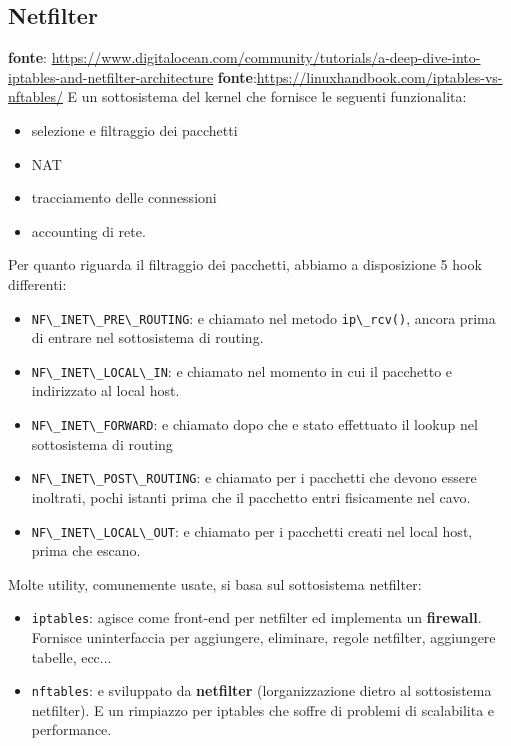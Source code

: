\subsection{Netfilter}\label{netfilter}

\textbf{fonte}:
\url{https://www.digitalocean.com/community/tutorials/a-deep-dive-into-iptables-and-netfilter-architecture}
\textbf{fonte}:\url{https://linuxhandbook.com/iptables-vs-nftables/}
E\textquotesingle{} un sottosistema del kernel che fornisce le seguenti
funzionalita:

\begin{itemize}
\tightlist
\item
  selezione e filtraggio dei pacchetti
\item
  NAT
\item
  tracciamento delle connessioni
\item
  accounting di rete.
\end{itemize}

Per quanto riguarda il filtraggio dei pacchetti, abbiamo a disposizione
5 hook differenti:

\begin{itemize}
\tightlist
\item
  \passthrough{\lstinline!NF\_INET\_PRE\_ROUTING!}: e\textquotesingle{}
  chiamato nel metodo \passthrough{\lstinline!ip\_rcv()!}, ancora prima
  di entrare nel sottosistema di routing.
\item
  \passthrough{\lstinline!NF\_INET\_LOCAL\_IN!}: e\textquotesingle{}
  chiamato nel momento in cui il pacchetto e\textquotesingle{}
  indirizzato al local host.
\item
  \passthrough{\lstinline!NF\_INET\_FORWARD!}: e\textquotesingle{}
  chiamato dopo che e\textquotesingle{} stato effettuato il lookup nel
  sottosistema di routing
\item
  \passthrough{\lstinline!NF\_INET\_POST\_ROUTING!}: e\textquotesingle{}
  chiamato per i pacchetti che devono essere inoltrati, pochi istanti
  prima che il pacchetto entri fisicamente nel cavo.
\item
  \passthrough{\lstinline!NF\_INET\_LOCAL\_OUT!}: e\textquotesingle{}
  chiamato per i pacchetti creati nel local host, prima che escano.
\end{itemize}

Molte utility, comunemente usate, si basa sul sottosistema netfilter:

\begin{itemize}
\tightlist
\item
  \passthrough{\lstinline!iptables!}: agisce come front-end per
  netfilter ed implementa un \textbf{firewall}. Fornisce
  un\textquotesingle interfaccia per aggiungere, eliminare, regole
  netfilter, aggiungere tabelle, ecc...
\item
  \passthrough{\lstinline!nftables!}: e\textquotesingle{} sviluppato da
  \textbf{netfilter} (l\textquotesingle organizzazione dietro al
  sottosistema netfilter). E\textquotesingle{} un rimpiazzo per iptables
  che soffre di problemi di scalabilita e performance.
\end{itemize}

